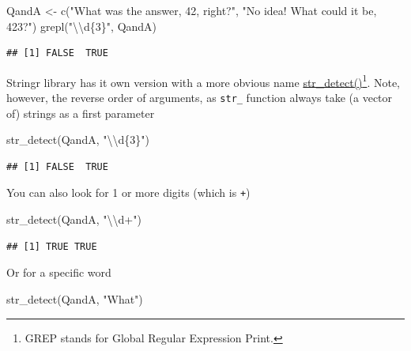 \documentclass[
]{book}
\newenvironment{Shaded}{\begin{snugshade}}{\end{snugshade}}
\newcommand{\FunctionTok}[1]{\textcolor[rgb]{0.00,0.00,0.00}{#1}}
\newcommand{\NormalTok}[1]{#1}
\newcommand{\OtherTok}[1]{\textcolor[rgb]{0.56,0.35,0.01}{#1}}
\newcommand{\SpecialCharTok}[1]{\textcolor[rgb]{0.00,0.00,0.00}{#1}}
\newcommand{\StringTok}[1]{\textcolor[rgb]{0.31,0.60,0.02}{#1}}
\begin{document}
\begin{Shaded}
\begin{Highlighting}[]
\NormalTok{QandA }\OtherTok{\textless{}{-}} \FunctionTok{c}\NormalTok{(}\StringTok{"What was the answer, 42, right?"}\NormalTok{, }\StringTok{"No idea! What could it be, 423?"}\NormalTok{)}
\FunctionTok{grepl}\NormalTok{(}\StringTok{"}\SpecialCharTok{\textbackslash{}\textbackslash{}}\StringTok{d\{3\}"}\NormalTok{, QandA)}
\end{Highlighting}
\end{Shaded}

\begin{verbatim}
## [1] FALSE  TRUE
\end{verbatim}

Stringr library has it own version with a more obvious name \href{https://stringr.tidyverse.org/reference/str_detect.html}{str\_detect()}\footnote{GREP stands for Global Regular Expression Print.}. Note, however, the reverse order of arguments, as \texttt{str\_} function always take (a vector of) strings as a first parameter

\begin{Shaded}
\begin{Highlighting}[]
\FunctionTok{str\_detect}\NormalTok{(QandA, }\StringTok{"}\SpecialCharTok{\textbackslash{}\textbackslash{}}\StringTok{d\{3\}"}\NormalTok{)}
\end{Highlighting}
\end{Shaded}

\begin{verbatim}
## [1] FALSE  TRUE
\end{verbatim}

You can also look for 1 or more digits (which is \texttt{+})

\begin{Shaded}
\begin{Highlighting}[]
\FunctionTok{str\_detect}\NormalTok{(QandA, }\StringTok{"}\SpecialCharTok{\textbackslash{}\textbackslash{}}\StringTok{d+"}\NormalTok{)}
\end{Highlighting}
\end{Shaded}

\begin{verbatim}
## [1] TRUE TRUE
\end{verbatim}

Or for a specific word

\begin{Shaded}
\begin{Highlighting}[]
\FunctionTok{str\_detect}\NormalTok{(QandA, }\StringTok{"What"}\NormalTok{)}
\end{Highlighting}
\end{Shaded}
\end{document}
